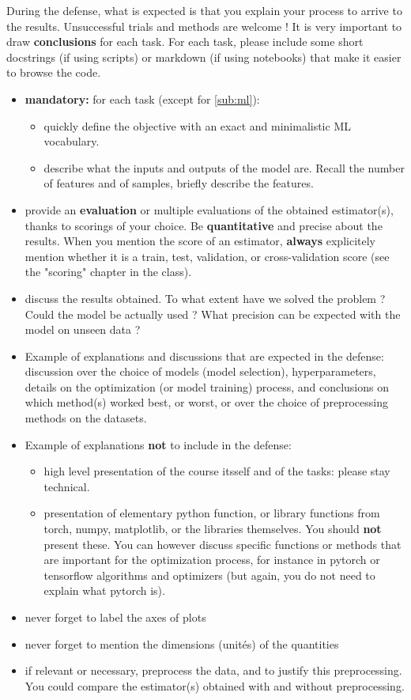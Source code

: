 \documentclass[
10pt, %
a4paper, %
oneside, %
headinclude,footinclude, %
BCOR5mm, %
]{scrartcl}
\begin{document}
During the defense, what is expected is that you explain your process to arrive to the results. Unsuccessful trials and methods are welcome ! It is very important to draw \textbf{conclusions} for each task. For each task, please include some short docstrings (if using scripts) or markdown (if using notebooks) that make it easier to browse the code.

\begin{itemize}
    \item \textbf{mandatory:} for  each task (except for \ref{sub:ml}):
	\begin{itemize}
        \item quickly define the objective with an exact and minimalistic ML vocabulary.
		\item describe what the inputs and outputs of the model are. Recall the number of features and of samples, briefly describe the features.
	\end{itemize}
    \item provide an \textbf{{evaluation}} or multiple evaluations of the obtained estimator(s), thanks to scorings of your choice. Be \textbf{quantitative} and precise about the results. When you mention the score of an estimator, \textbf{always} explicitely mention whether it is a train, test, validation, or cross-validation score (see the "scoring" chapter in the class).
    \item discuss the results obtained. To what extent have we solved the problem ? Could the model be actually used ? What precision can be expected with the model on unseen data ?
    \item Example of explanations and discussions that are expected in the defense: discussion over the choice of models (model selection), hyperparameters, details on the optimization (or model training) process, and conclusions on which method(s) worked best, or worst, or over the choice of preprocessing methods on the datasets.
    \item Example of explanations \textbf{not }to include in the defense:
        \begin{itemize}
            \item high level presentation of the course itsself and of the tasks: please stay technical.
            \item presentation of elementary python function, or library functions from torch, numpy, matplotlib, or the libraries themselves. You should \textbf{not} present these. You can however discuss specific functions or methods that are important for the optimization process, for instance in pytorch or tensorflow algorithms and optimizers (but again, you do not need to explain what pytorch is).
        \end{itemize}
	\item never forget to label the axes of plots
	\item never forget to mention the dimensions (unités) of the quantities
    \item if relevant or necessary, preprocess the data, and to justify this preprocessing. You could compare the estimator(s) obtained with and without preprocessing.
\end{itemize}
\end{document}

